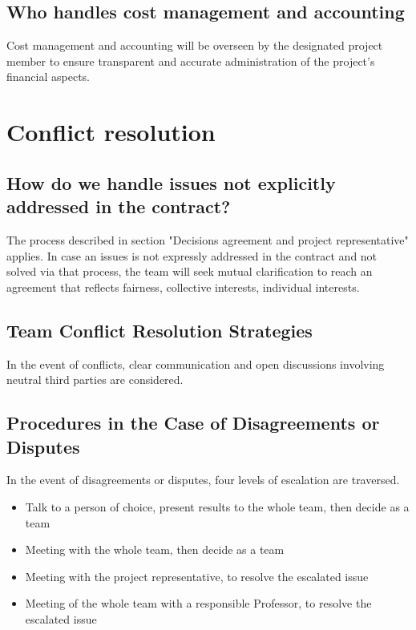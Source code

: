 \subsection{Who handles cost management and accounting}
Cost management and accounting will be overseen by the designated project member to ensure transparent and accurate administration of the project's financial aspects.

\section{Conflict resolution}
\subsection{How do we handle issues not explicitly addressed in the contract?}
The process described in section "Decisions agreement and project representative" applies.
In case an issues is not expressly addressed in the contract and not solved via that process, the team will seek mutual clarification to reach an agreement that reflects fairness, collective interests, individual interests.
\subsection{Team Conflict Resolution Strategies}
In the event of conflicts, clear communication and open discussions involving neutral third parties are considered.
\subsection{Procedures in the Case of Disagreements or Disputes}
In the event of disagreements or disputes, four levels of escalation are traversed.
\begin{itemize}
    \item Talk to a person of choice, present results to the whole team, then decide as a team
    \item Meeting with the whole team, then decide as a team
    \item Meeting with the project representative, to resolve the escalated issue
    \item Meeting of the whole team with a responsible Professor, to resolve the escalated issue
\end{itemize}
